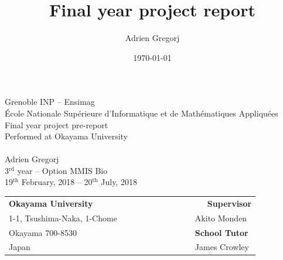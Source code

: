 \documentclass[12pt,a4paper,twoside]{article}
\title{Final year project report}
\author{Adrien Gregorj}
\date{\today}
\begin{document}
\lstset{ numbers=left, tabsize=3, frame=single, numberstyle=\ttfamily, basicstyle=\footnotesize} 
\thispagestyle{empty}

\begin{center}
Grenoble INP  -- Ensimag\\
École Nationale Supérieure d'Informatique et de Mathématiques Appliquées\\
\vspace{3cm}
{\LARGE Final year project pre-report}\\
\vspace{1cm}
Performed at Okayama University\\
\vspace{2cm}
\\
\vspace{3cm}
Adrien Gregorj\\
3$^{\text{rd}}$ year -- Option MMIS Bio\\
\vspace{3mm}
19$^{\text{th}}$ February, 2018 -- 20$^{\text{th}}$ July, 2018\\
\vspace{4cm}
\begin{tabular}{p{10cm}p{10cm}}
{\bf Okayama University}                                     & ~~~~~~~~~~~~~~~~~~~~{\bf Supervisor}\\
{\footnotesize 1-1, Tsushima-Naka, 1-Chome}                           & ~~~~~~~~~~~~~~~~~Akito Monden\\
{\footnotesize Okayama 700-8530}                                        & ~~~~~~~~~~~~~~~~~{\bf School Tutor}\\
{\footnotesize Japan}                         & ~~~~~~~~~~~~~~~~~James Crowley\\
\end{tabular}
\end{center}
\newpage
\end{document}
